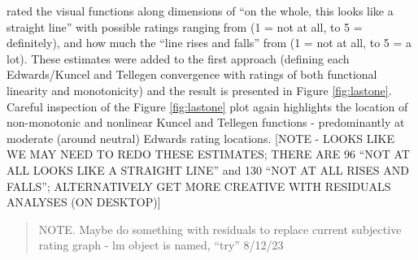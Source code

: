 \documentclass[
  ,jou]{apa6}
\begin{document}
\endgroup

rated the visual functions along dimensions of ``on the whole, this looks like a straight line'' with possible ratings ranging from (1 = not at all, to 5 = definitely), and how much the ``line rises and falls'' from (1 = not at all, to 5 = a lot). These estimates were added to the first approach (defining each Edwards/Kuncel and Tellegen convergence with ratings of both functional linearity and monotonicity) and the result is presented in Figure \ref{fig:lastone}. Careful inspection of the Figure \ref{fig:lastone} plot again highlights the location of non-monotonic and nonlinear Kuncel and Tellegen functions - predominantly at moderate (around neutral) Edwards rating locations. {[}NOTE - LOOKS LIKE WE MAY NEED TO REDO THESE ESTIMATES; THERE ARE 96 ``NOT AT ALL LOOKS LIKE A STRAIGHT LINE'' and 130 ``NOT AT ALL RISES AND FALLS''; ALTERNATIVELY GET MORE CREATIVE WITH RESIDUALS ANALYSES (ON DESKTOP){]}

\begin{quote}
NOTE. Maybe do something with residuals to replace current subjective rating graph - lm object is named, ``try'' 8/12/23
\end{quote}
\end{document}
